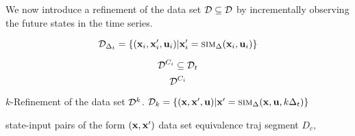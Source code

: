 We now introduce a refinement of the data set $\mathcal{D} \subseteq \mathcal{D}$ by
incrementally observing the future states in the time series.



\[\mathcal{D}_{\Delta_t} = \{(\mathbf{x}_i,\mathbf{x}'_i,\mathbf{u}_i) | \mathbf{x}'_i =
\mbox{\sc sim}_\Delta(\mathbf{x}_i,\mathbf{u}_i)\}\]

\[\mathcal{D}^{C_i} \subseteq \mathcal{D}_t\]
\[\mathcal{D}^{C_i}\]


$k$-Refinement of the data set $\mathcal{D}^k$.
$\mathcal{D}_k = \{(\mathbf{x},\mathbf{x}',\mathbf{u}) | \mathbf{x}' =  \mbox{\sc sim}_\Delta(\mathbf{x},\mathbf{u},k\Delta_t)\}$

state-input pairs of the form
$(\mathbf{x},\mathbf{x}')$
data set equivalence traj segment
$D_c, $
